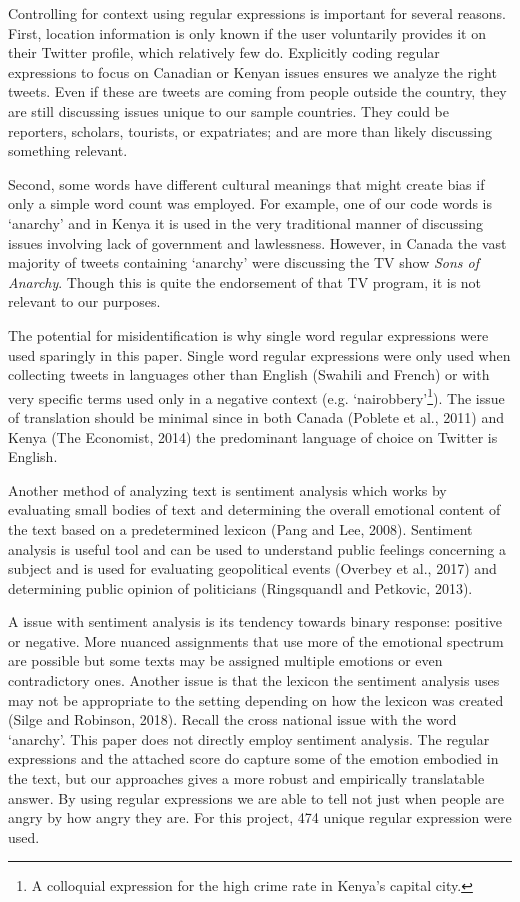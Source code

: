 \documentclass[12pt]{article}
\begin{document}
\begin{spacing}{1.5}

Controlling for context using regular expressions is important for several reasons. First, location information is only known if the user voluntarily provides it on their Twitter profile, which relatively few do. Explicitly coding regular expressions to focus on Canadian or Kenyan issues ensures we analyze the right tweets. Even if these are tweets are coming from people outside the country, they are still discussing issues unique to our sample countries. They could be reporters, scholars, tourists, or expatriates; and are more than likely discussing something relevant.    

Second, some words have different cultural meanings that might create bias if only a simple word count was employed. For example, one of our code words is `anarchy' and in Kenya it is used in the very traditional manner of discussing issues involving lack of government and lawlessness. However, in Canada the vast majority of tweets containing `anarchy' were discussing the TV show \textit{Sons of Anarchy}. Though this is quite the endorsement of that TV program, it is not relevant to our purposes. 

The potential for misidentification is why single word regular expressions were used sparingly in this paper. Single word regular expressions were only used when collecting tweets in languages other than English (Swahili and French) or with very specific terms used only in a negative context (e.g. `nairobbery'\footnote{A colloquial expression for the high crime rate in Kenya's capital city.}). The issue of translation should be minimal since in both Canada (Poblete et al., 2011) and Kenya (The Economist, 2014) the predominant language of choice on Twitter is English. 


Another method of analyzing text is sentiment analysis which works by evaluating small bodies of text and determining the overall emotional content of the text based on a predetermined lexicon (Pang and Lee, 2008). Sentiment analysis is useful tool and can be used to understand public feelings concerning a subject and is used for evaluating geopolitical events (Overbey et al., 2017) and determining public opinion of politicians (Ringsquandl and Petkovic, 2013). 

A issue with sentiment analysis is its tendency towards binary response: positive or negative. More nuanced assignments that use more of the emotional spectrum are possible but some texts may be assigned multiple emotions or even contradictory ones. Another issue is that the lexicon the sentiment analysis uses may not be appropriate to the setting depending on how the lexicon was created (Silge and Robinson, 2018). Recall the cross national issue with the word `anarchy'. This paper does not directly employ sentiment analysis. The regular expressions and the attached score do capture some of the emotion embodied in the text, but our approaches gives a more robust and empirically translatable answer. By using regular expressions we are able to tell not just when people are angry by how angry they are. For this project, 474 unique regular expression were used.  


\end{spacing}
\end{document}
